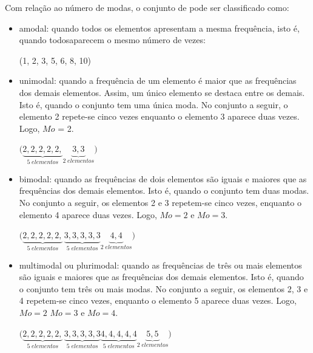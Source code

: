 Com relação ao número de modas, o conjunto de pode ser classificado como:

\begin{itemize}
    \item amodal: quando todos os elementos apresentam a mesma frequência, isto é, quando todosaparecem o mesmo número de vezes:
    
    \begin{center}
    (1, 2, 3, 5, 6, 8, 10)
    \end{center}

\item unimodal: quando a frequência de um elemento é maior que as frequências dos demais elementos. Assim, um único elemento se destaca entre os demais. Isto é, quando o conjunto tem uma única moda. No conjunto a seguir, o elemento 2 repete-se cinco vezes enquanto o elemento 3 aparece duas vezes. Logo, $Mo$ = 2.

    \begin{center}
    $\Bigg
    (\underbrace{2, 2, 2, 2, 2,}_{5\; elementos} 
    \underbrace{3,3}_{2\; elementos}\Bigg)$
    \end{center}

\item bimodal: quando as frequências de dois elementos são iguais e maiores que as frequências dos demais elementos. Isto é, quando o conjunto tem duas modas. No conjunto a seguir, os elementos 2 e 3 repetem-se cinco vezes, enquanto o elemento 4 aparece duas vezes. Logo, $Mo = 2$ e $Mo=3$.

    \begin{center}
    $\Bigg(\underbrace{2, 2, 2, 2, 2,}_{5\; elementos}\, \underbrace{3, 3, 3, 3, 3}_{5\; elementos}
    \underbrace{4, 4}_{2\; elementos}\Bigg)$
    \end{center}

\item multimodal ou plurimodal: quando as frequências de três ou mais elementos são iguais e maiores que as frequências dos demais elementos. Isto é, quando o conjunto tem três ou mais modas. No conjunto a seguir, os elementos 2, 3 e 4 repetem-se cinco vezes, enquanto o elemento 5 aparece duas vezes. Logo, $Mo = 2$  $Mo=3$ e $Mo=4$.

    \begin{center}
    $\Bigg(\underbrace{2, 2, 2, 2, 2,}_{5\; elementos}\, \underbrace{3, 3, 3, 3, 3}_{5\; elementos}
    \underbrace{4, 4, 4, 4, 4}_{5\; elementos}
    \underbrace{5, 5}_{2\; elementos}\Bigg)$
    \end{center}
\end{itemize}

